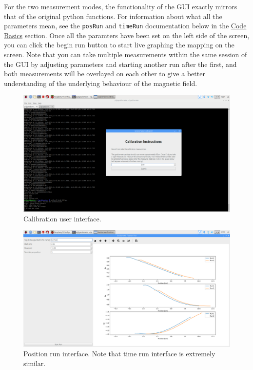 \documentclass{TheMartianReport}
\newcommand{\pyinline}[1]{\texttt{#1}}
\begin{document}
For the two measurement modes, the functionality of the GUI exactly mirrors that of the original python functions. For information about what all the parameters mean, see the \pyinline{posRun} and \pyinline{timeRun} documentation below in the \hyperref[subsec:CodeBasics]{Code Basics} section. Once all the paramters have been set on the left side of the screen, you can click the begin run button to start live graphing the mapping on the screen. Note that you can take multiple measurements within the same session of the GUI by adjusting parameters and starting another run after the first, and both measurements will be overlayed on each other to give a better understanding of the underlying behaviour of the magnetic field. 

\begin{figure}[h]
	\centering
	\includegraphics[scale=0.2]{GUI_calibration}
	\caption{Calibration user interface.}
	\label{fig:PSUpinouts}
\end{figure}

\begin{figure}[h]
	\centering
	\includegraphics[scale=0.2]{GUI_posRun}
	\caption{Position run interface. Note that time run interface is extremely similar.}
	\label{fig:PSUpinouts}
\end{figure}
\end{document}
